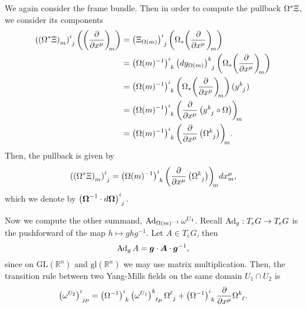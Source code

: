 \begin{example}
    We again consider the frame bundle. Then in order to compute the pullback \({\Omega}^{\ast}_{}{\Xi}\), we consider its components
    \begin{align*}
        \left(\left(\pb{\Omega}{\Xi}\right)_m\right)\indices{^i_j}\left(\bvec{x^\mu}{m}\right)
        &= \left(\Xi_{\Omega(m)}\right)\indices{^i_j}\left(\pf{\Omega}{\bvec{x^\mu}{m}}\right)\\
        &= \left(\Omega(m)^{-1}\right)\indices{^i_k} \left(dy_{\Omega(m)}\right)\indices{^k_j}\left(\pf{\Omega}{\bvec{x^\mu}{m}}\right)\\
        &= \left(\Omega(m)^{-1}\right)\indices{^i_k} \left(\pf{\Omega}{\bvec{x^\mu}{m}}\right)(y\indices{^k_j})\\
        &= \left(\Omega(m)^{-1}\right)\indices{^i_k} \bvec[\left(y\indices{^k_j} \circ \Omega\right)]{x^\mu}{m}\\
        &= \left(\Omega(m)^{-1}\right)\indices{^i_k} \bvec[\left(\Omega\indices{^k_j}\right)]{x^\mu}{m}.
    \end{align*}
    Then, the pullback is given by
    \begin{equation*}
        \left(\left(\pb{\Omega}{\Xi}\right)_m\right)\indices{^i_j} = \left(\Omega(m)^{-1}\right)\indices{^i_k} \bvec[\left(\Omega\indices{^k_j}\right)]{x^\mu}{m} dx_m^\mu,
    \end{equation*}
    which we denote by \(\left(\boldsymbol{\Omega}^{-1} \cdot d \boldsymbol{\Omega}\right)\indices{^i_j}.\)

    Now we compute the other summand, \(\operatorname{Ad}_{\Omega(m)^{-1}}{\omega^{U_1}}\). Recall \(\operatorname{Ad}_{g} : T_eG \to T_eG\) is the pushforward of the map \(h \mapsto ghg^{-1}.\) Let \(A \in T_eG\), then
    \begin{equation*}
        \operatorname{Ad}_{g}A = \boldsymbol{g}\cdot \boldsymbol{A} \cdot \boldsymbol{g}^{-1},
    \end{equation*}
    since on \(\mathrm{GL}(\mathbb{R}^n)\) and \(\mathrm{gl}(\mathbb{R}^n)\) we may use matrix multiplication. Then, the transition rule between two Yang-Mills fields on the same domain \(U_1 \cap U_2\) is
    \begin{equation*}
        \left(\omega^{U_2}\right)\indices{^i_{j\mu}} = \left(\Omega^{-1}\right)\indices{^i_k} \left(\omega^{U_1}\right)\indices{^k_{\ell \mu}} \Omega\indices{^\ell_j} + \left(\Omega^{-1}\right)\indices{^i_k} \bfield{x^\mu} \Omega\indices{^k_\ell}.
    \end{equation*}
\end{example}

